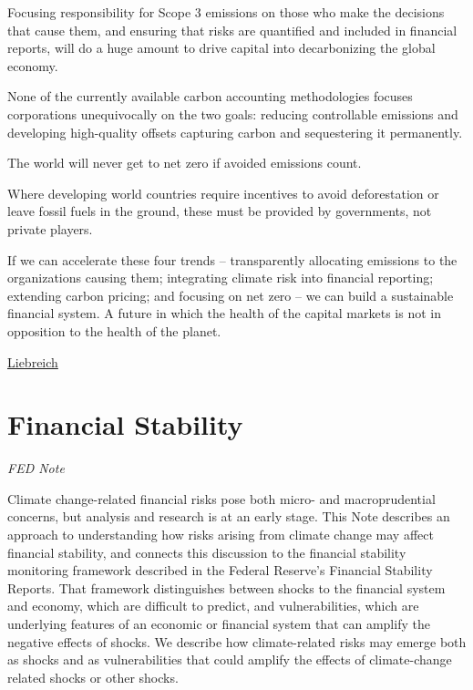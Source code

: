 \documentclass[
]{book}
\begin{document}
Focusing responsibility for Scope 3 emissions on those who make the decisions that cause them, and ensuring that risks are quantified and included in financial reports, will do a huge amount to drive capital into decarbonizing the global economy.

None of the currently available carbon accounting methodologies
focuses corporations unequivocally on the two goals:
reducing controllable emissions and
developing high-quality offsets capturing carbon and sequestering it permanently.

The world will never get to net zero if avoided emissions count.

Where developing world countries require incentives to avoid deforestation
or leave fossil fuels in the ground,
these must be provided by governments, not private players.

If we can accelerate these four trends -- transparently allocating emissions to the organizations causing them; integrating climate risk into financial reporting; extending carbon pricing; and focusing on net zero -- we can build a sustainable financial system. A future in which the health of the capital markets is not in opposition to the health of the planet.

\href{https://about.bnef.com/blog/liebreich-climate-and-finance-lessons-from-a-time-machine/}{Liebreich}

\hypertarget{financial-stability}{%
\section{Financial Stability}\label{financial-stability}}

\emph{FED Note}

Climate change-related financial risks pose both micro- and macroprudential concerns, but analysis and research is at an early stage.
This Note describes an approach to understanding how risks arising from climate change may affect financial stability, and connects this discussion to the financial stability monitoring framework described in the Federal Reserve's Financial Stability Reports.
That framework distinguishes between shocks to the financial system and economy, which are difficult to predict, and vulnerabilities, which are underlying features of an economic or financial system that can amplify the negative effects of shocks.
We describe how climate-related risks may emerge both as shocks and as vulnerabilities that could amplify the effects of climate-change related shocks or other shocks.
\end{document}
